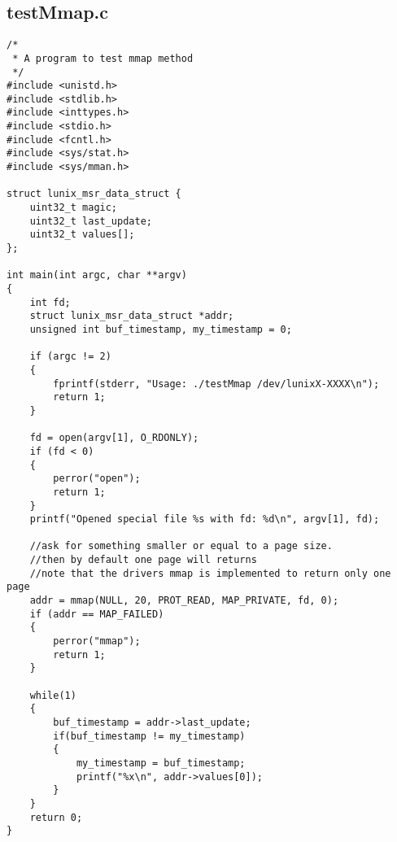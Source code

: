 \documentclass[a4paper]{article}
\begin{document}
\subsection*{testMmap.c}
\label{sec:testMmap.c}
\begin{lstlisting}[style=CStyle]
/*
 * A program to test mmap method
 */
#include <unistd.h>
#include <stdlib.h>
#include <inttypes.h>
#include <stdio.h>
#include <fcntl.h>
#include <sys/stat.h>
#include <sys/mman.h>

struct lunix_msr_data_struct {
    uint32_t magic;
    uint32_t last_update;
    uint32_t values[];
};

int main(int argc, char **argv)
{
    int fd;
    struct lunix_msr_data_struct *addr;
    unsigned int buf_timestamp, my_timestamp = 0;

    if (argc != 2)
    {
        fprintf(stderr, "Usage: ./testMmap /dev/lunixX-XXXX\n");
        return 1;
    }

    fd = open(argv[1], O_RDONLY);
    if (fd < 0)
    {
        perror("open");
        return 1;
    }
    printf("Opened special file %s with fd: %d\n", argv[1], fd);

    //ask for something smaller or equal to a page size.
    //then by default one page will returns
    //note that the drivers mmap is implemented to return only one page
    addr = mmap(NULL, 20, PROT_READ, MAP_PRIVATE, fd, 0);
    if (addr == MAP_FAILED)
    {
        perror("mmap");
        return 1;
    }

    while(1)
    {
        buf_timestamp = addr->last_update;
        if(buf_timestamp != my_timestamp)
        {
            my_timestamp = buf_timestamp;
            printf("%x\n", addr->values[0]);
        }
    }
    return 0;
}
\end{lstlisting}
\end{document}
